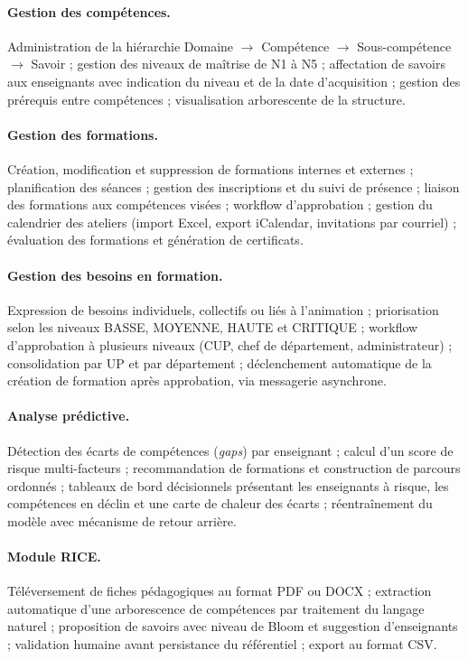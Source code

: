 \documentclass[12pt,a4paper]{report}
\begin{document}
\paragraph{Gestion des compétences.}
Administration de la hiérarchie
Domaine $\rightarrow$ Compétence $\rightarrow$ Sous-compétence $\rightarrow$ Savoir ;
gestion des niveaux de maîtrise de N1 à N5 ; affectation de savoirs aux
enseignants avec indication du niveau et de la date d'acquisition ; gestion des
prérequis entre compétences ; visualisation arborescente de la structure.

\paragraph{Gestion des formations.}
Création, modification et suppression de formations internes et externes ;
planification des séances ; gestion des inscriptions et du suivi de présence ;
liaison des formations aux compétences visées ; workflow d'approbation ;
gestion du calendrier des ateliers (import Excel, export iCalendar,
invitations par courriel) ; évaluation des formations et génération de
certificats.

\paragraph{Gestion des besoins en formation.}
Expression de besoins individuels, collectifs ou liés à l'animation ;
priorisation selon les niveaux BASSE, MOYENNE, HAUTE et CRITIQUE ; workflow
d'approbation à plusieurs niveaux (CUP, chef de département, administrateur) ;
consolidation par UP et par département ; déclenchement automatique de la
création de formation après approbation, via messagerie asynchrone.

\paragraph{Analyse prédictive.}
Détection des écarts de compétences (\textit{gaps}) par enseignant ; calcul d'un
score de risque multi-facteurs ; recommandation de formations et construction de
parcours ordonnés ; tableaux de bord décisionnels présentant les enseignants à
risque, les compétences en déclin et une carte de chaleur des écarts ;
réentraînement du modèle avec mécanisme de retour arrière.

\paragraph{Module RICE.}
Téléversement de fiches pédagogiques au format PDF ou DOCX ; extraction
automatique d'une arborescence de compétences par traitement du langage
naturel ; proposition de savoirs avec niveau de Bloom et suggestion
d'enseignants ; validation humaine avant persistance du référentiel ; export au
format CSV.
\end{document}
